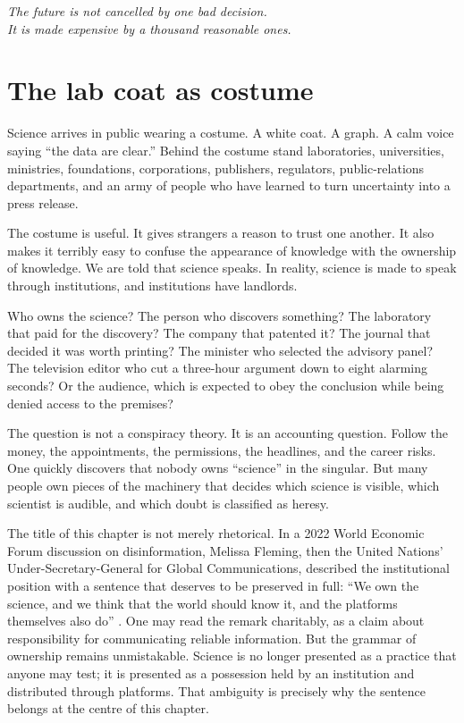 ﻿\documentclass[12pt,a4paper]{book}
\begin{document}
\begin{flushright}
\emph{The future is not cancelled by one bad decision.\\
It is made expensive by a thousand reasonable ones.}
\end{flushright}

\section{The lab coat as costume}

Science arrives in public wearing a costume. A white coat. A graph. A calm
voice saying ``the data are clear.'' Behind the costume stand laboratories,
universities, ministries, foundations, corporations, publishers, regulators,
public-relations departments, and an army of people who have learned to turn
uncertainty into a press release.

The costume is useful. It gives strangers a reason to trust one another. It
also makes it terribly easy to confuse the appearance of knowledge with the
ownership of knowledge. We are told that science speaks. In reality, science
is made to speak through institutions, and institutions have landlords.

Who owns the science? The person who discovers something? The laboratory that
paid for the discovery? The company that patented it? The journal that decided
it was worth printing? The minister who selected the advisory panel? The
television editor who cut a three-hour argument down to eight alarming
seconds? Or the audience, which is expected to obey the conclusion while being
denied access to the premises?

The question is not a conspiracy theory. It is an accounting question. Follow
the money, the appointments, the permissions, the headlines, and the career
risks. One quickly discovers that nobody owns ``science'' in the singular. But
many people own pieces of the machinery that decides which science is visible,
which scientist is audible, and which doubt is classified as heresy.

The title of this chapter is not merely rhetorical. In a 2022 World Economic
Forum discussion on disinformation, Melissa Fleming, then the United Nations'
Under-Secretary-General for Global Communications, described the institutional
position with a sentence that deserves to be preserved in full: ``We own the
science, and we think that the world should know it, and the platforms
themselves also do'' \cite{FlemingMelissa}. One may read the remark charitably,
as a claim about responsibility for communicating reliable information. But
the grammar of ownership remains unmistakable. Science is no longer presented
as a practice that anyone may test; it is presented as a possession held by an
institution and distributed through platforms. That ambiguity is precisely why
the sentence belongs at the centre of this chapter.
\end{document}
